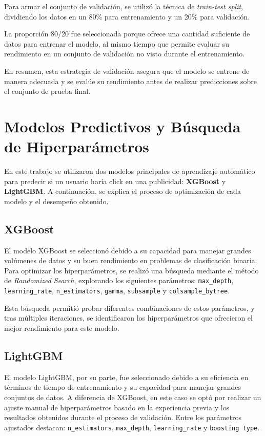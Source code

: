 \documentclass[a4paper,12pt]{article}
\begin{document}
Para armar el conjunto de validación, se utilizó la técnica de \textit{train-test split}, dividiendo los datos en un 80\% para entrenamiento y un 20\% para validación.

La proporción 80/20 fue seleccionada porque ofrece una cantidad suficiente de datos para entrenar el modelo, al mismo tiempo que permite evaluar su rendimiento en un conjunto de validación no visto durante el entrenamiento.

En resumen, esta estrategia de validación asegura que el modelo se entrene de manera adecuada y se evalúe su rendimiento antes de realizar predicciones sobre el conjunto de prueba final.


\section{Modelos Predictivos y Búsqueda de Hiperparámetros}

En este trabajo se utilizaron dos modelos principales de aprendizaje automático para predecir si un usuario haría click en una publicidad: \textbf{XGBoost} y \textbf{LightGBM}. A continuación, se explica el proceso de optimización de cada modelo y el desempeño obtenido.

\subsection{XGBoost}

El modelo XGBoost se seleccionó debido a su capacidad para manejar grandes volúmenes de datos y su buen rendimiento en problemas de clasificación binaria. Para optimizar los hiperparámetros, se realizó una búsqueda mediante el método de \textit{Randomized Search}, explorando los siguientes parámetros: \texttt{max\_depth}, \texttt{learning\_rate}, \texttt{n\_estimators}, \texttt{gamma}, \texttt{subsample} y \texttt{colsample\_bytree}.

Esta búsqueda permitió probar diferentes combinaciones de estos parámetros, y tras múltiples iteraciones, se identificaron los hiperparámetros que ofrecieron el mejor rendimiento para este modelo.

\subsection{LightGBM}

El modelo LightGBM, por su parte, fue seleccionado debido a su eficiencia en términos de tiempo de entrenamiento y su capacidad para manejar grandes conjuntos de datos. A diferencia de XGBoost, en este caso se optó por realizar un ajuste manual de hiperparámetros basado en la experiencia previa y los resultados obtenidos durante el proceso de validación. Entre los parámetros ajustados destacan: \texttt{n\_estimators}, \texttt{max\_depth}, \texttt{learning\_rate} y \texttt{boosting type}.
\end{document}
